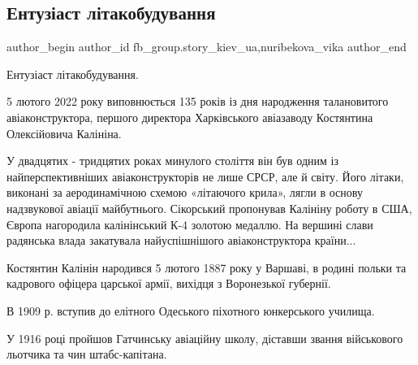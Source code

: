  
 
 
 
 
 
\subsection{Ентузіаст літакобудування}
\label{sec:05_02_2022.fb.fb_group.story_kiev_ua.1.entuziast_litakobuduvannja}
 
\ifcmt
 author_begin
   author_id fb_group.story_kiev_ua,nuribekova_vika
 author_end
\fi

Ентузіаст літакобудування.

5 лютого 2022 року виповнюється 135 років із дня народження талановитого
авіаконструктора, першого директора Харківського авіазаводу Костянтина
Олексійовича Калініна. 

У двадцятих - тридцятих роках минулого століття він був одним із
найперспективніших авіаконструкторів не лише СРСР, але й світу. Його літаки,
виконані за аеродинамічною схемою «літаючого крила», лягли в основу надзвукової
авіації майбутнього. Сікорський пропонував Калініну роботу в США, Європа
нагородила калінінський К-4 золотою медаллю. На вершині слави радянська влада
закатувала найуспішнішого авіаконструктора країни...


Костянтин Калінін народився 5 лютого 1887 року у Варшаві, в родині польки та
кадрового офіцера царської армії, вихідця з Воронезької губернії. 

В 1909 р. вступив до елітного Одеського піхотного юнкерського училища. 

У 1916 році пройшов Гатчинську авіаційну школу, діставши звання військового
льотчика та чин штабс-капітана. 


